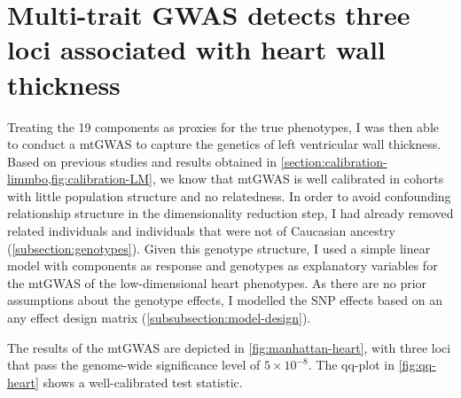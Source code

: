 \section{Multi-trait GWAS detects three loci associated with heart wall thickness}
\label{section:GWAS-3Dheart}
Treating the \num{19} components as proxies for the true phenotypes, I was then able to conduct a mtGWAS to capture the genetics of left ventricular wall thickness. Based on previous studies \citep{Price2006,Patterson2006} and results obtained in \cref{section:calibration-limmbo,fig:calibration-LM}, we know that mtGWAS is well calibrated in cohorts with little population structure and no relatedness. In order to avoid confounding relationship structure in the dimensionality reduction step, I had already removed related individuals and individuals that were not of Caucasian ancestry (\cref{subsection:genotypes}). Given this genotype structure, I used a simple linear model with components as response and genotypes as explanatory variables for the mtGWAS of the low-dimensional heart phenotypes. As there are no prior assumptions about the genotype effects, I modelled the SNP effects based on an any effect design matrix (\cref{subsubsection:model-design}). 

The results of the mtGWAS are depicted in \cref{fig:manhattan-heart}, with three loci that pass the genome-wide significance level of \(5 \times 10^{-8}\). The qq-plot in \cref{fig:qq-heart} shows a well-calibrated test statistic.

